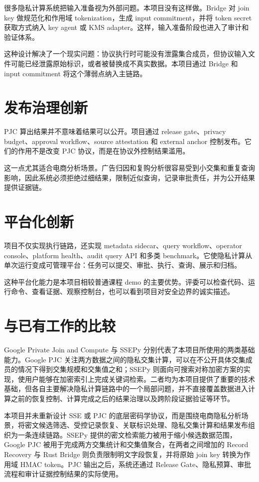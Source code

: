 \documentclass[UTF8,a4paper,12pt,oneside]{ctexrep}
\begin{document}
很多隐私计算系统把输入准备视为外部问题。本项目没有这样做。Bridge 对 join key 做规范化和作用域 tokenization，生成 input commitment，并将 token secret 获取方式纳入 key agent 或 KMS adapter。这样，输入准备阶段也进入了审计和验证体系。

这种设计解决了一个现实问题：协议执行时可能没有泄露集合成员，但协议输入文件可能已经泄露原始标识，或者被替换成不真实数据。本项目通过 Bridge 和 input commitment 将这个薄弱点纳入主链路。

\section{发布治理创新}

PJC 算出结果并不意味着结果可以公开。项目通过 release gate、privacy budget、approval workflow、source attestation 和 external anchor 控制发布。它们的作用不是改变 PJC 协议，而是在协议外控制结果滥用。

这一点尤其适合电商分析场景。广告归因和复购分析很容易受到小交集和重复查询影响，因此系统必须拒绝过细结果，限制近似查询，记录审批责任，并为公开结果提供证据链。

\section{平台化创新}

项目不仅实现执行链路，还实现 metadata sidecar、query workflow、operator console、platform health、audit query API 和多类 benchmark。它使隐私计算从单次运行变成可管理平台：任务可以提交、审批、执行、查询、展示和归档。

这种平台化能力是本项目相较普通课程 demo 的主要优势。评委可以检查代码、运行命令、查看证据、观察控制台，也可以看到项目对安全边界的诚实描述。

\section{与已有工作的比较}

Google Private Join and Compute 与 SSEPy 分别代表了本项目所使用的两类基础能力。Google PJC 关注两方数据之间的隐私交集计算，可以在不公开具体交集成员的情况下得到交集规模和交集值之和；SSEPy 则面向可搜索对称加密方案的实现，使用户能够在加密索引上完成关键词检索。二者均为本项目提供了重要的技术基础，但各自主要解决隐私计算链路中的一个局部问题，并不直接覆盖数据进入计算之前的恢复控制、计算完成之后的结果治理以及跨阶段证据验证等环节\cite{googlepjc,ssepy}。

本项目并未重新设计 SSE 或 PJC 的底层密码学协议，而是围绕电商隐私分析场景，将密文候选筛选、受控记录恢复、关联标识处理、隐私交集计算和结果发布组织为一条连续链路。SSEPy 提供的密文检索能力被用于缩小候选数据范围，Google PJC 被用于完成两方交集统计和交集值聚合，在两者之间增加的 Record Recovery 与 Rust Bridge 则负责限制明文字段恢复，并将原始 join key 转换为作用域 HMAC token。PJC 输出之后，系统还通过 Release Gate、隐私预算、审批流程和审计证据控制结果的实际使用。
\end{document}
